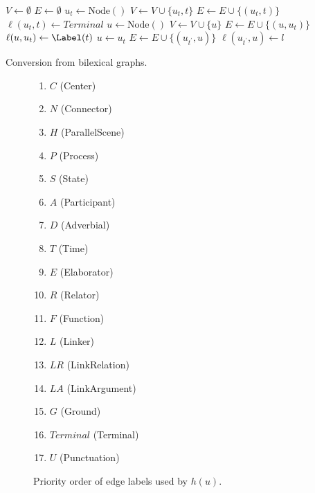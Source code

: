 \documentclass[11pt,a4paper]{article}
\begin{document}
\begin{algorithm}[ht]
 $V \leftarrow \emptyset$\;
 $E \leftarrow \emptyset$\;
  {
  $u_t \leftarrow \mathrm{Node()}$\;
  $V \leftarrow V \cup \{u_t, t\}$\;
  $E \leftarrow E \cup \{(u_t, t)\}$\;
  $\ell(u_t,t)\leftarrow\mathit{Terminal}$\;
   {
    {
     {
     $u \leftarrow \mathrm{Node()}$\;
     $V \leftarrow V \cup \{u\}$\;
     $E \leftarrow E \cup \{(u, u_t)\}$\;
     $\ell(u, u_t) \leftarrow \Label(t)$\;
    } {
     $u \leftarrow u_t$\;
    }
    $E \leftarrow E \cup \{(u_{t^\prime}, u)\}$\;
    $\ell(u_{t^\prime}, u) \leftarrow l$\;
    }
  }
 }
 
  
 \caption{Conversion from bilexical graphs.}
 \label{alg:from_bilexical}
\end{algorithm}

\begin{figure}[ht]
\begin{enumerate}
\itemsep0em
\item $C$ (Center)
\item $N$ (Connector)
\item $H$ (ParallelScene)
\item $P$ (Process)
\item $S$ (State)
\item $A$ (Participant)
\item $D$ (Adverbial)
\item $T$ (Time)
\item $E$ (Elaborator)
\item $R$ (Relator)
\item $F$ (Function)
\item $L$ (Linker)
\item $LR$ (LinkRelation)
\item $LA$ (LinkArgument)
\item $G$ (Ground)
\item $\mathit{Terminal}$ (Terminal)
\item $U$ (Punctuation)
\end{enumerate}
\caption{Priority order of edge labels used by $h(u)$.}
\label{fig:priority}
\end{figure}
\end{document}
